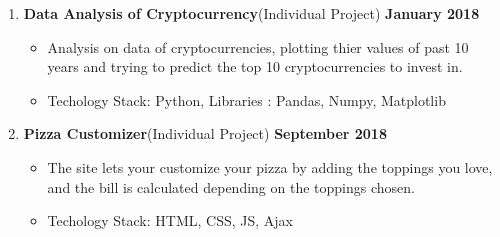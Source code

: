 \documentclass[paper=a4,fontsize=12pt]{scrartcl}
\begin{document}
\begin{enumerate}
    \item \textbf{Data Analysis of Cryptocurrency}(Individual Project) \textbf{January 2018}
\begin{itemize}
\item Analysis on data of cryptocurrencies, plotting thier values of past 10 years and trying to predict the top 10 cryptocurrencies to invest in.
\item Techology Stack: Python, Libraries : Pandas, Numpy, Matplotlib
\end{itemize}

    \item \textbf{Pizza Customizer}(Individual Project) \textbf{September 2018}
\begin{itemize}
\item The site lets your customize your pizza by adding the toppings you love, and the bill is calculated depending on the toppings chosen.
\item Techology Stack: HTML, CSS, JS, Ajax
\end{itemize}
\end{enumerate}
\end{document}
